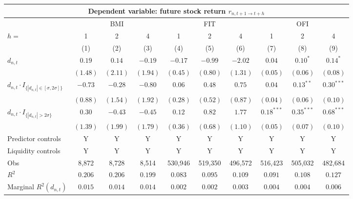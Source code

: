 \begin{tabular}{lccccccccc}
  \hline \multicolumn{10}{c}{Dependent variable: future stock return $r_{n,t+1 \to t+h}$} \\

                                    \hline & \multicolumn{3}{c}{BMI} & \multicolumn{3}{c}{FIT} & \multicolumn{3}{c}{OFI} \\
 \cmidrule(l){2-4} \cmidrule(l){5-7} \cmidrule(l){8-10} 

                                    $h = $ & 1 & 2 & 4 & 1 & 2 & 4 & 1 & 2 & 4 \\
 \cmidrule(l){2-4} \cmidrule(l){5-7} \cmidrule(l){8-10} \vspace{5pt}  
  & (1) & (2) & (3) & (4) & (5) & (6) & (7) & (8) & (9) \\ 
  $d_{n,t}$ & $0.19$ & $0.14$ & $-0.19$ & $-0.17$ & $-0.99$ & $-2.02$ & $0.04$ & $0.10^{*}$ & $0.14^{*}$ \\ 
   & $(1.48)$ & $(2.11)$ & $(1.94)$ & $(0.45)$ & $(0.80)$ & $(1.31)$ & $(0.05)$ & $(0.06)$ & $(0.08)$ \\ 
  $d_{n,t} \cdot I_{\{|d_{n,t}| \in [\sigma, 2\sigma]\}}$ & $-0.73$ & $-0.28$ & $-0.80$ & $0.06$ & $0.48$ & $0.75$ & $0.04$ & $0.13^{**}$ & $0.30^{***}$ \\ 
   & $(0.88)$ & $(1.54)$ & $(1.92)$ & $(0.28)$ & $(0.52)$ & $(0.87)$ & $(0.04)$ & $(0.06)$ & $(0.10)$ \\ 
  $d_{n,t} \cdot I_{\{|d_{n,t}| > 2\sigma\}}$ & $0.30$ & $-0.43$ & $-0.45$ & $0.12$ & $0.82$ & $1.77$ & $0.18^{***}$ & $0.35^{***}$ & $0.68^{***}$ \\ 
   \vspace{5pt} & $(1.39)$ & $(1.99)$ & $(1.79)$ & $(0.36)$ & $(0.68)$ & $(1.10)$ & $(0.05)$ & $(0.07)$ & $(0.10)$ \\ 
  Predictor controls & Y & Y & Y & Y & Y & Y & Y & Y & Y \\ 
   \vspace{5pt}Liquidity controls & Y & Y & Y & Y & Y & Y & Y & Y & Y \\ 
  Obs & 8,872 & 8,728 & 8,514 & 530,946 & 519,350 & 496,572 & 516,423 & 505,032 & 482,684 \\ 
  $R^2$ & $0.206$ & $0.206$ & $0.199$ & $0.083$ & $0.095$ & $0.109$ & $0.091$ & $0.108$ & $0.127$ \\ 
  Marginal $R^2(d_{n,t})$ & $0.015$ & $0.014$ & $0.014$ & $0.002$ & $0.002$ & $0.003$ & $0.004$ & $0.004$ & $0.006$ \\ 
   \hline 
\end{tabular}
